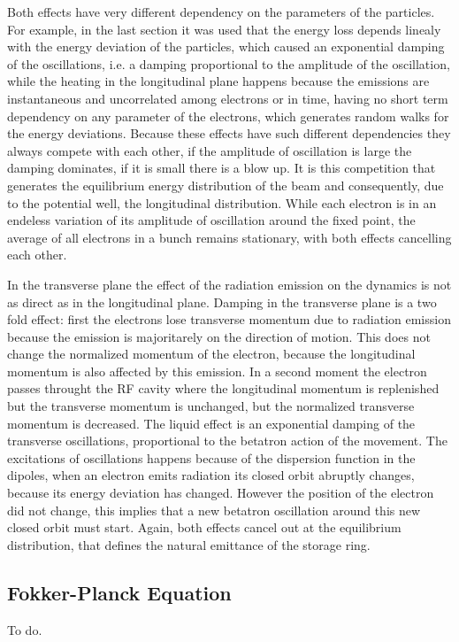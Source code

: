 \documentclass[
	12pt,				%
	openright,			%
	oneside,			%
	a4paper,		%
	chapter=TITLE,		%
	section=TITLE,		%
    brazil,				%
	english,			%
	sumario=tradicional,
	]{abntex2}
\begin{document}
  Both effects have very different dependency on the parameters of the particles. For example, in the last section it was used that the energy loss depends linealy with the energy deviation of the particles, which caused an exponential damping of the oscillations, i.e. a damping proportional to the amplitude of the oscillation, while the heating in the longitudinal plane happens because the emissions are instantaneous and uncorrelated among electrons or in time, having no short term dependency on any parameter of the electrons, which generates random walks for the energy deviations. Because these effects have such different dependencies they always compete with each other, if the amplitude of oscillation is large the damping dominates, if it is small there is a blow up. It is this competition that generates the equilibrium energy distribution of the beam and consequently, due to the potential well, the longitudinal distribution. While each electron is in an endeless variation of its amplitude of oscillation around the fixed point, the average of all electrons in a bunch remains stationary, with both effects cancelling each other.

  In the transverse plane the effect of the radiation emission on the dynamics is not as direct as in the longitudinal plane. Damping in the transverse plane is a two fold effect: first the electrons lose transverse momentum due to radiation emission because the emission is majoritarely on the direction of motion. This does not change the normalized momentum of the electron, because the longitudinal momentum is also affected by this emission. In a second moment the electron passes throught the RF cavity where the longitudinal momentum is replenished but the transverse momentum is unchanged, but the normalized transverse momentum is decreased. The liquid effect is an exponential damping of the transverse oscillations, proportional to the betatron action of the movement. The excitations of oscillations happens because of the dispersion function in the dipoles, when an electron emits radiation its closed orbit abruptly changes, because its energy deviation has changed. However the position of the electron did not change, this implies that a new betatron oscillation around this new closed orbit must start. Again, both effects cancel out at the equilibrium distribution, that defines the natural emittance of the storage ring.

    \subsection{Fokker-Planck Equation}
	To do.
\end{document}
